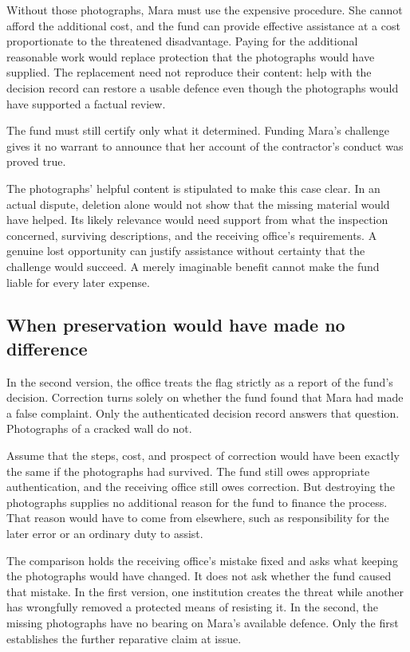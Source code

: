 Without those photographs, Mara must use the expensive procedure. She cannot afford the additional cost, and the fund can provide effective assistance at a cost proportionate to the threatened disadvantage. Paying for the additional reasonable work would replace protection that the photographs would have supplied. The replacement need not reproduce their content: help with the decision record can restore a usable defence even though the photographs would have supported a factual review.

The fund must still certify only what it determined. Funding Mara’s challenge gives it no warrant to announce that her account of the contractor’s conduct was proved true.

The photographs’ helpful content is stipulated to make this case clear. In an actual dispute, deletion alone would not show that the missing material would have helped. Its likely relevance would need support from what the inspection concerned, surviving descriptions, and the receiving office’s requirements. A genuine lost opportunity can justify assistance without certainty that the challenge would succeed. A merely imaginable benefit cannot make the fund liable for every later expense.

\subsection*{When preservation would have made no difference}

In the second version, the office treats the flag strictly as a report of the fund’s decision. Correction turns solely on whether the fund found that Mara had made a false complaint. Only the authenticated decision record answers that question. Photographs of a cracked wall do not.

Assume that the steps, cost, and prospect of correction would have been exactly the same if the photographs had survived. The fund still owes appropriate authentication, and the receiving office still owes correction. But destroying the photographs supplies no additional reason for the fund to finance the process. That reason would have to come from elsewhere, such as responsibility for the later error or an ordinary duty to assist.

The comparison holds the receiving office’s mistake fixed and asks what keeping the photographs would have changed. It does not ask whether the fund caused that mistake. In the first version, one institution creates the threat while another has wrongfully removed a protected means of resisting it. In the second, the missing photographs have no bearing on Mara’s available defence. Only the first establishes the further reparative claim at issue.

